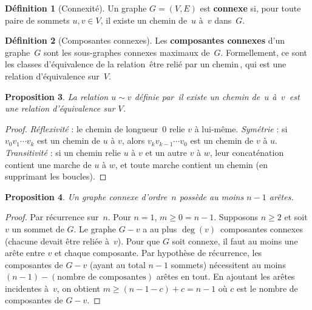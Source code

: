 \documentclass[12pt,a4paper,openany]{book}
\theoremstyle{definition}
\newtheorem{definition}{Définition}[chapter]
\theoremstyle{plain}
\newtheorem{proposition}[definition]{Proposition}
\theoremstyle{remark}
\providecommand{\og}{\guillemotleft\,}
\providecommand{\fg}{\,\guillemotright}
\begin{document}
\begin{definition}[Connexité]
\label{def:connexite}
Un graphe $G = (V, E)$ est \textbf{connexe} si, pour toute paire de sommets
$u, v \in V$, il existe un chemin de~$u$ à~$v$ dans~$G$.
\end{definition}

\begin{definition}[Composantes connexes]
\label{def:comp-connexe}
Les \textbf{composantes connexes} d'un graphe~$G$ sont les sous-graphes connexes
maximaux de~$G$. Formellement, ce sont les classes d'équivalence de la relation
\og être relié par un chemin\fg{}, qui est une relation d'équivalence sur~$V$.
\end{definition}

\begin{proposition}
\label{prop:comp-connexe-equiv}
La relation $u \sim v$ définie par \og il existe un chemin de~$u$ à~$v$\fg{}
est une relation d'équivalence sur $V$.
\end{proposition}

\begin{proof}
\emph{Réflexivité} : le chemin de longueur~$0$ relie $v$ à lui-même.
\emph{Symétrie} : si $v_0 v_1 \cdots v_k$ est un chemin de $u$ à $v$, alors
$v_k v_{k-1} \cdots v_0$ est un chemin de $v$ à $u$.
\emph{Transitivité} : si un chemin relie $u$ à $v$ et un autre $v$ à $w$,
leur concaténation contient une marche de $u$ à $w$, et toute marche contient
un chemin (en supprimant les boucles).
\end{proof}

\begin{proposition}
\label{prop:arete-connexe}
Un graphe connexe d'ordre~$n$ possède au moins $n - 1$ arêtes.
\end{proposition}

\begin{proof}
Par récurrence sur~$n$. Pour $n = 1$, $m \geq 0 = n - 1$. Supposons $n \geq 2$
et soit $v$ un sommet de $G$. Le graphe $G - v$ a au plus $\deg(v)$~composantes
connexes (chacune devait être reliée à~$v$). Pour que $G$ soit connexe, il faut
au moins une arête entre $v$ et chaque composante. Par hypothèse de récurrence,
les composantes de $G - v$ (ayant au total $n-1$ sommets) nécessitent au moins
$(n-1) - (\text{nombre de composantes})$ arêtes en tout. En ajoutant les arêtes
incidentes à~$v$, on obtient $m \geq (n-1-c) + c = n - 1$ où $c$ est le nombre
de composantes de $G - v$.
\end{proof}
\end{document}
